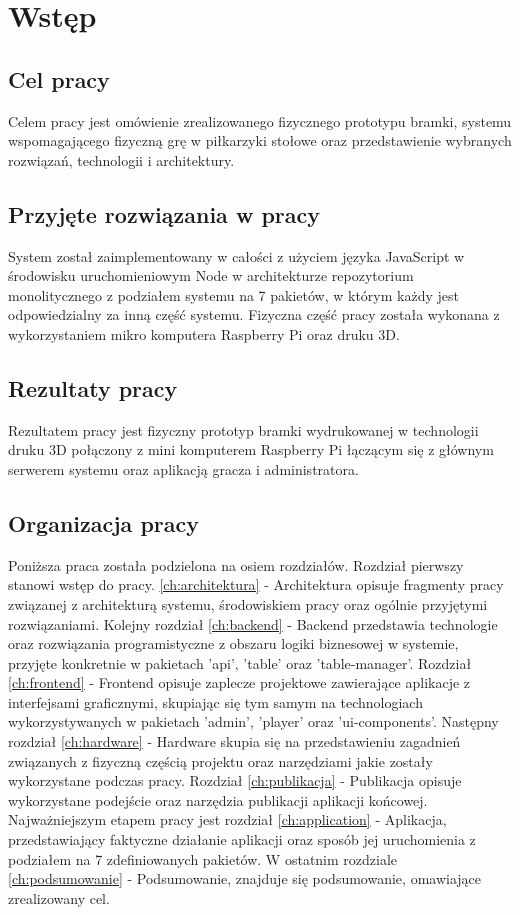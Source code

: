 \chapter{Wstęp}
\label{ch:wstęp}

\section{Cel pracy}
Celem pracy jest omówienie zrealizowanego fizycznego prototypu bramki, systemu wspomagającego fizyczną grę w piłkarzyki stołowe oraz przedstawienie wybranych rozwiązań, technologii i architektury.

\section{Przyjęte rozwiązania w pracy}
System został zaimplementowany w całości z użyciem języka JavaScript w środowisku uruchomieniowym Node w architekturze repozytorium monolitycznego z podziałem systemu na 7 pakietów, w którym każdy jest odpowiedzialny za inną część systemu. Fizyczna część pracy została wykonana z wykorzystaniem mikro komputera Raspberry Pi oraz druku 3D.

\section{Rezultaty pracy}
Rezultatem pracy jest fizyczny prototyp bramki wydrukowanej w technologii druku 3D połączony z mini komputerem Raspberry Pi łączącym się z głównym serwerem systemu oraz aplikacją gracza i administratora.

\section{Organizacja pracy}
Poniższa praca została podzielona na osiem rozdziałów. Rozdział pierwszy stanowi wstęp do pracy. \ref{ch:architektura} - Architektura opisuje fragmenty pracy związanej z architekturą systemu, środowiskiem pracy oraz ogólnie przyjętymi rozwiązaniami. 
Kolejny rozdział \ref{ch:backend} - Backend przedstawia technologie oraz rozwiązania programistyczne z obszaru logiki biznesowej w systemie, przyjęte konkretnie w pakietach 'api', 'table' oraz 'table-manager'.
Rozdział \ref{ch:frontend} - Frontend opisuje zaplecze projektowe zawierające aplikacje z interfejsami graficznymi, skupiając się tym samym na technologiach wykorzystywanych w pakietach 'admin', 'player' oraz 'ui-components'.
Następny rozdział \ref{ch:hardware} - Hardware skupia się na przedstawieniu zagadnień związanych z fizyczną częścią projektu oraz narzędziami jakie zostały wykorzystane podczas pracy.
Rozdział \ref{ch:publikacja} - Publikacja opisuje wykorzystane podejście oraz narzędzia publikacji aplikacji końcowej.
Najważniejszym etapem pracy jest rozdział \ref{ch:application} - Aplikacja, przedstawiający faktyczne działanie aplikacji oraz sposób jej uruchomienia z podziałem na 7 zdefiniowanych pakietów.
W ostatnim rozdziale \ref{ch:podsumowanie} - Podsumowanie, znajduje się podsumowanie, omawiające zrealizowany cel.

